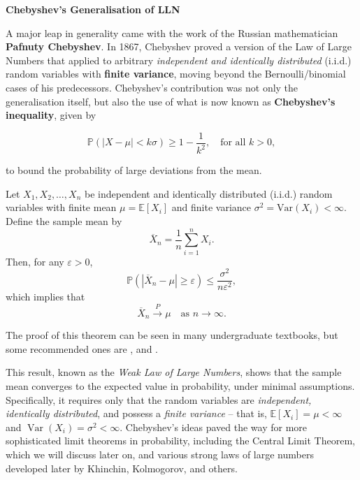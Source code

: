 \noindent\textbf{Chebyshev's Generalisation of LLN}
\vspace{0.5em}


A major leap in generality came with the work of the Russian mathematician \textbf{Pafnuty Chebyshev}. In 1867, Chebyshev proved a version of the Law of Large Numbers that applied to arbitrary \textit{independent and identically distributed} (i.i.d.) random variables with \textbf{finite variance}, moving beyond the Bernoulli/binomial cases of his predecessors. Chebyshev's contribution was not only the generalisation itself, but also the use of what is now known as \textbf{Chebyshev's inequality}, given by 

\[
\mathbb{P}(|X - \mu| < k\sigma) \geq 1 - \frac{1}{k^2}, \quad \text{for all } k > 0, 
\]

\noindent to bound the probability of large deviations from the mean.




\begin{theorem}
Let $X_1, X_2, \dots, X_n$ be independent and identically distributed (i.i.d.) random variables with finite mean $\mu = \mathbb{E}[X_i]$ and finite variance $\sigma^2 = \text{Var}(X_i) < \infty$. Define the sample mean by
\[
\overline{X}_n = \frac{1}{n} \sum_{i=1}^n X_i.
\]
Then, for any $\varepsilon > 0$,
\[
\mathbb{P}\left( \left| \overline{X}_n - \mu \right| \geq \varepsilon \right) \leq \frac{\sigma^2}{n \varepsilon^2},
\]
which implies that
\[
\overline{X}_n \xrightarrow{P} \mu \quad \text{as } n \to \infty.
\]
\end{theorem}

The proof of this theorem can be seen in many undergraduate textbooks, but some recommended ones are \cite{grimmett2014probability}, \cite{grinstead2012introduction} and \cite{ross2020first}.

\medskip

This result, known as the \textit{Weak Law of Large Numbers}, shows that the sample mean converges to the expected value in probability, under minimal assumptions. Specifically, it requires only that the random variables are \textit{independent, identically distributed}, and possess a \textit{finite variance} -- that is, \( \mathbb{E}[X_i] = \mu < \infty \) and \( \operatorname{Var}(X_i) = \sigma^2 < \infty \). Chebyshev's ideas paved the way for more sophisticated limit theorems in probability, including the Central Limit Theorem, which we will discuss later on, and various strong laws of large numbers developed later by Khinchin, Kolmogorov, and others.

